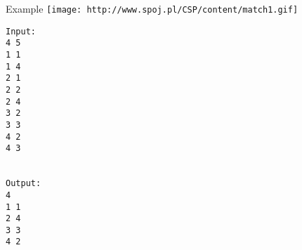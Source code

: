Example
\texttt{[image: http://www.spoj.pl/CSP/content/match1.gif]}
\begin{verbatim}
Input:
4 5
1 1
1 4
2 1
2 2
2 4
3 2
3 3
4 2
4 3


Output:
4
1 1
2 4
3 3
4 2

\end{verbatim}